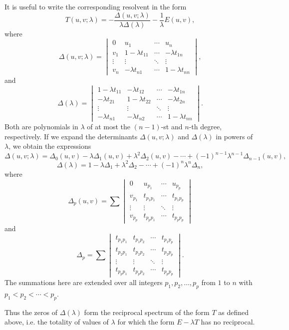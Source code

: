 It is useful to write the corresponding resolvent in the form
\[
 T(u,v;\lambda)
 =-\frac{\Delta(u,v;\lambda)}{\lambda\Delta(\lambda)}-\frac1\lambda E(u,v),
\]
where
\[
 \Delta(u,v;\lambda)=
 \begin{vmatrix}
 0&u_1&\cdots&u_n\\
 v_1&1-\lambda t_{11}&\cdots&-\lambda t_{1n}\\
 \vdots&\vdots&\ddots&\vdots\\
 v_n&-\lambda t_{n1}&\cdots&1-\lambda t_{nn}
 \end{vmatrix},
\]
and
\[
 \Delta(\lambda)=
 \begin{vmatrix}
 1-\lambda t_{11}&-\lambda t_{12}&\cdots&-\lambda t_{1n}\\
 -\lambda t_{21}&1-\lambda t_{22}&\cdots&-\lambda t_{2n}\\
 \vdots&\vdots&\ddots&\vdots\\
 -\lambda t_{n1}&-\lambda t_{n2}&\cdots&1-\lambda t_{nn}
 \end{vmatrix}.
\]
Both are polynomials in $\lambda$ of at most the $(n-1)$-st and $n$-th degree, respectively. If we expand the determinants $\Delta(u,v;\lambda)$ and $\Delta(\lambda)$ in powers of $\lambda$, we obtain the expressions
\[
\Delta(u,v;\lambda)=\Delta_0(u,v)-\lambda\Delta_1(u,v)+\lambda^2\Delta_2(u,v)-\cdots+(-1)^{n-1}\lambda^{n-1}\Delta_{n-1}(u,v),
\]
\[
\Delta(\lambda)=1-\lambda\Delta_1+\lambda^2\Delta_2-\cdots+(-1)^n\lambda^n\Delta_n,
\]
where
\[
\Delta_p(u,v)=\sum
\begin{vmatrix}
0&u_{p_1}&\cdots&u_{p_p}\\
v_{p_1}&t_{p_1p_1}&\cdots&t_{p_1p_p}\\
\vdots&\vdots&\ddots&\vdots\\
v_{p_p}&t_{p_pp_1}&\cdots&t_{p_pp_p}
\end{vmatrix}
\]
and
\[
\Delta_p=\sum
\begin{vmatrix}
t_{p_1p_1}&t_{p_1p_2}&\cdots&t_{p_1p_p}\\
t_{p_2p_1}&t_{p_2p_2}&\cdots&t_{p_2p_p}\\
\vdots&\vdots&\ddots&\vdots\\
t_{p_pp_1}&t_{p_pp_2}&\cdots&t_{p_pp_p}
\end{vmatrix}.
\]
The summations here are extended over all integers $p_1,p_2,\ldots,p_p$ from $1$ to $n$ with $p_1<p_2<\cdots<p_p$.

Thus the zeros of $\Delta(\lambda)$ form the reciprocal spectrum of the form $T$ as defined above, i.e. the totality of values of $\lambda$ for which the form $E-\lambda T$ has no reciprocal.

